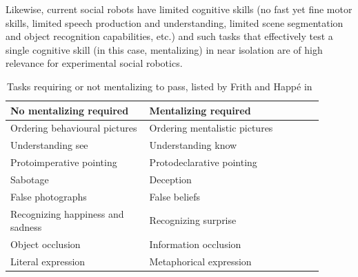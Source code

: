 \documentclass[11pt,a4paper]{report}
\begin{document}
Likewise, current social robots have limited cognitive skills (no fast yet fine
motor skills, limited speech production and understanding, limited scene
segmentation and object recognition capabilities, etc.) and such tasks
that effectively test a single cognitive skill (in this case, mentalizing) in
near isolation are of high relevance for experimental social robotics.

\begin{table}[h]
    \centering
    \begin{tabular}{p{0.4\linewidth}p{0.5\linewidth}}
        \toprule
        No mentalizing required           & Mentalizing required          \\
        \midrule
        Ordering behavioural pictures     & Ordering mentalistic pictures~\cite{baron1986mechanical} \\
        Understanding see                 & Understanding know~\cite{perner1989exploration}            \\
        Protoimperative pointing          & Protodeclarative pointing~\cite{baron1989perceptual}     \\
        Sabotage                          & Deception~\cite{sodian1992deception}                     \\
        False photographs                 & False beliefs~\cite{leslie1992domain}                 \\
        Recognizing happiness and sadness & Recognizing surprise~\cite{baron1993children}          \\
        Object occlusion                  & Information occlusion~\cite{baron1992out}         \\
        Literal expression                & Metaphorical expression~\cite{happe1993communicative}       \\
        \bottomrule
    \end{tabular}
    \caption{\small Tasks requiring or not mentalizing to pass, listed by Frith and Happé in~\cite{frith1994autism}}
    \label{mentalizing-tasks}
\end{table}
\end{document}
